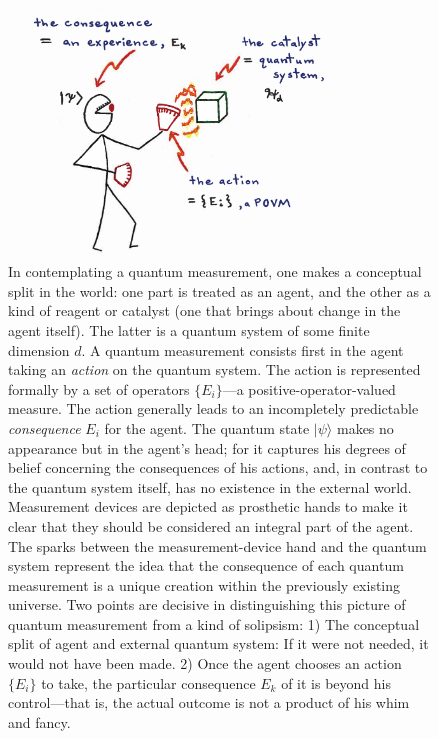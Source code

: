 \documentclass[aps,pra,superscriptaddress,10pt,tightenlines,twocolumn,nofootinbib]{revtex4}
\begin{document}
\begin{figure}
\begin{center}
\includegraphics[height=2.6in]{paulianidea-n3}
\bigskip\caption{ In contemplating a quantum measurement, one makes a conceptual split in the world:  one part is treated as an agent, and the other as a kind of reagent or catalyst (one that brings about change in the agent itself).  The latter is a quantum system of some finite dimension $d$.  A quantum measurement consists first in the agent taking an {\it action\/} on the quantum system.  The action is represented formally by a set of operators $\{E_i\}$---a positive-operator-valued measure. The action generally leads to an incompletely predictable {\it consequence\/} $E_i$ for the agent.  The quantum state $|\psi\rangle$ makes no appearance but in the agent's head; for it captures his degrees of belief concerning the consequences of his actions, and, in contrast to the quantum system itself, has no existence in the external world.  Measurement devices are depicted as prosthetic hands to make it clear that they should be considered an integral part of the agent.  The sparks between the measurement-device hand and the quantum system represent the idea that the consequence of each quantum measurement is a unique creation within the previously existing universe.  Two points are decisive in distinguishing this picture of quantum measurement from a kind of solipsism:  1) The conceptual split of agent and external quantum system: If it were not needed, it would not have been made. 2) Once the agent chooses an action $\{E_i\}$ to take, the particular consequence $E_k$ of it is beyond his control---that is, the actual outcome is not a product of his whim and fancy.}
\end{center}
\end{figure}
\end{document}
